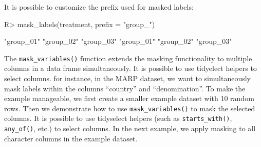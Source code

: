\documentclass[
]{jss}
\begin{document}
It is possible to customize the prefix used for masked labels:

\begin{CodeChunk}
\begin{CodeInput}
R> mask_labels(treatment, prefix = "group_")
\end{CodeInput}
\begin{CodeOutput}
[1] "group_01" "group_02" "group_03" "group_01" "group_02" "group_03"
\end{CodeOutput}
\end{CodeChunk}

The \texttt{mask\_variables()} function extends the masking
functionality to multiple columns in a data frame simultaneously. It is
possible to use tidyelect helpers to select columns. for instance, in
the MARP dataset, we want to simultaneously mask labels within the
columns ``country'' and ``denomination''. To make the example
manageable, we first create a smaller example dataset with 10 random
rows. Then we demonstrate how to use \texttt{mask\_variables()} to mask
the selected columns. It is possible to use tidyselect helpers (such as
\texttt{starts\_with()}, \texttt{any\_of()}, etc.) to select columns. In
the next example, we apply masking to all character columns in the
example dataset.
\end{document}
